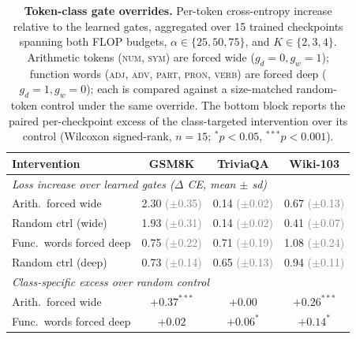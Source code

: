 \documentclass[11pt]{article}
\newcommand{\ssub}[1]{{\scriptsize\textcolor{gray}{(#1)}}}
\newcommand{\rev}[1]{{\color{red}#1}}
\begin{document}
\begin{table}[t]
\centering
\small
\setlength{\tabcolsep}{4pt}
\renewcommand{\arraystretch}{1.05}
\rev{%
\begin{tabular}{lccc}
\toprule
\textbf{Intervention} & \textbf{GSM8K} & \textbf{TriviaQA} & \textbf{Wiki-103} \\
\midrule
\multicolumn{4}{l}{\emph{Loss increase over learned gates ($\Delta$ CE, mean $\pm$ sd)}} \\
\quad Arith.\ forced wide            & 2.30 \ssub{$\pm$0.35} & 0.14 \ssub{$\pm$0.02} & 0.67 \ssub{$\pm$0.13} \\
\quad Random ctrl (wide)             & 1.93 \ssub{$\pm$0.31} & 0.14 \ssub{$\pm$0.02} & 0.41 \ssub{$\pm$0.07} \\
\quad Func.\ words forced deep       & 0.75 \ssub{$\pm$0.22} & 0.71 \ssub{$\pm$0.19} & 1.08 \ssub{$\pm$0.24} \\
\quad Random ctrl (deep)             & 0.73 \ssub{$\pm$0.14} & 0.65 \ssub{$\pm$0.13} & 0.94 \ssub{$\pm$0.11} \\
\midrule
\multicolumn{4}{l}{\emph{Class-specific excess over random control}} \\
\quad Arith.\ forced wide            & $+0.37^{***}$ & $+0.00$ & $+0.26^{***}$ \\
\quad Func.\ words forced deep       & $+0.02$       & $+0.06^{*}$ & $+0.14^{*}$ \\
\bottomrule
\end{tabular}
}
\caption{\rev{\textbf{Token-class gate overrides.} Per-token
cross-entropy increase relative to the learned gates, aggregated over
15 trained checkpoints spanning both FLOP budgets,
$\alpha \in \{25, 50, 75\}$, and $K \in \{2,3,4\}$. Arithmetic tokens
(\textsc{num}, \textsc{sym}) are forced wide ($g_d{=}0, g_w{=}1$);
function words (\textsc{adj}, \textsc{adv}, \textsc{part},
\textsc{pron}, \textsc{verb}) are forced deep ($g_d{=}1, g_w{=}0$);
each is compared against a size-matched random-token control under the
same override. The bottom block reports the paired per-checkpoint
excess of the class-targeted intervention over its control
(Wilcoxon signed-rank, $n{=}15$;
$^{*}p<0.05$, $^{***}p<0.001$).}}
\label{tab:token-class-overrides}
\end{table}
\end{document}
